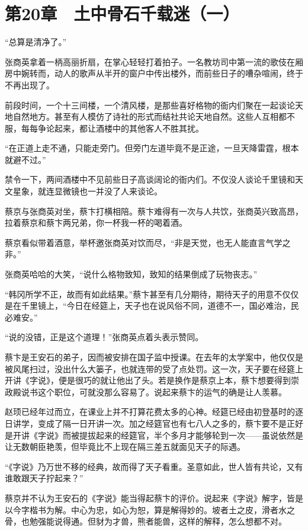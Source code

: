 \section{第20章　土中骨石千载迷（一）}

“总算是清净了。”

张商英拿着一柄高丽折扇，在掌心轻轻打着拍子。一名教坊司中第一流的歌伎在厢房中婉转而，动人的歌声从半开的窗户中传出楼外，而前些日子的嘈杂喧闹，终于不再出现了。

前段时间，一个十三间楼，一个清风楼，是那些喜好格物的衙内们聚在一起谈论天地自然地方。甚至有人模仿了诗社的形式而结社共论天地自然。这些人互相都不服，每每争论起来，都让酒楼中的其他客人不胜其扰。

“在正道上走不通，只能走旁门。但旁门左道毕竟不是正途，一旦天降雷霆，根本就避不过。”

禁令一下，两间酒楼中不见前些日子高谈阔论的衙内们。不仅没人谈论千里镜和天文星象，就连显微镜也一并没了人来谈论。

蔡京与张商英对坐，蔡卞打横相陪。蔡卞难得有一次与人共饮，张商英兴致高昂，拉着蔡京和蔡卞两兄弟，你一杯我一杯的喝着酒。

蔡京看似带着酒意，举杯邀张商英对饮而尽，“非是天觉，也无人能直言气学之非。”

张商英哈哈的大笑，“说什么格物致知，致知的结果倒成了玩物丧志。”

“韩冈所学不正，故而有如此结果。”蔡卞甚至有几分期待，期待天子的用意不仅仅是在千里镜上，“今日在经筵上，天子也在说风俗不同，道德不一，国必难治，民必难安。”

“说的没错，正是这个道理！”张商英点着头表示赞同。

蔡卞是王安石的弟子，因而被安排在国子监中授课。在去年的太学案中，他仅仅是被风尾扫过，没出什么大篓子，也就连带的受了点处罚。这一次，天子要在经筵上开讲《字说》，便是很巧的就让他出了头。若是换作是蔡京上本，蔡卞想要得到崇政殿说书这个职位，可就没那么容易了。说起来蔡卞的运气的确是让人羡慕。

赵顼已经年过而立，在课业上并不打算花费太多的心神。经筵已经由初登基时的逐日讲学，变成了隔一日开讲一次。加之经筵官也有七八人之多的，蔡卞要不是正好是开讲《字说》而被提拔起来的经筵官，半个多月才能够轮到一次——虽说依然是让无数朝臣艳羡，但毕竟比不上现在隔三差五就面见天子的际遇。

“《字说》乃万世不移的经典，故而得了天子看重。圣意如此，世人皆有共论，又有谁敢跟天子拧起来？”

蔡京并不认为王安石的《字说》能当得起蔡卞的评价。说起来《字说》解字，皆是以今字楷书为解。中心为忠，如心为恕，算是解得妙的。坡者土之皮，滑者水之骨，也勉强能说得通。但豺为才兽，熊者能兽，这样的解释，怎么想都不对。

